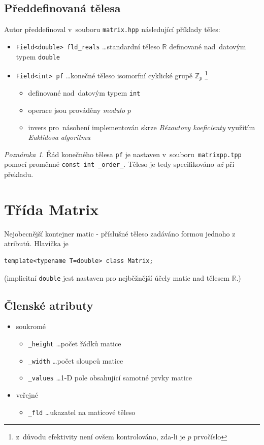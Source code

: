 \documentclass[11pt,a4paper]{article}
\newcommand{\R}{\mathbb{R}}
\theoremstyle{remark}
\newtheorem{note}[thm]{Poznámka}
\begin{document}
\subsection{Předdefinovaná tělesa}
 
Autor předdefinoval v~souboru \verb=matrix.hpp= následující příklady těles:
\begin{itemize}
  \item \verb=Field<double> fld_reals= \ldots standardní těleso $\R$ definované
    nad~datovým typem \verb=double=
  \item \verb=Field<int> pf= \ldots konečné těleso isomorfní cyklické grupě
    $\mathbb{Z}_p$\thinspace%
    \footnote{z~důvodu efektivity není ovšem kontrolováno, zda-li je $p$
    prvočíslo}
    \begin{itemize}
      \item definované nad~datovým typem \verb=int=
      \item operace jsou prováděny \emph{modulo $p$\/}
      \item invers pro~násobení implementován skrze \emph{Bézoutovy
        koeficienty\/} využitím \emph{Euklidova algoritmu\/}
    \end{itemize}
\end{itemize}

\begin{note}
  Řád konečného tělesa \verb=pf= je nastaven v~souboru~\verb=matrixpp.tpp=
  pomocí proměnné \verb=const int _order_=.
  Těleso je tedy specifikováno \emph{už\/} při překladu.
\end{note}

\section{Třída Matrix}

Nejobecnější kontejner matic - příslušné těleso zadáváno formou jednoho z
atributů.
Hlavička je
\begin{verbatim}
template<typename T=double> class Matrix;
\end{verbatim}
(implicitní \verb=double= jest nastaven pro nejběžnější účely matic nad tělesem
$\R$.)

\subsection{Členské atributy}

\begin{itemize}
  \item soukromé
  \begin{itemize}
    \item \verb=_height= \ldots počet řádků matice
    \item \verb=_width= \ldots počet sloupců matice
    \item \verb=_values= \ldots 1-D pole obsahující samotné prvky matice
  \end{itemize}
  \item veřejné
  \begin{itemize}
    \item \verb=_fld= \ldots ukazatel na maticové těleso
  \end{itemize}
\end{itemize}
\end{document}
